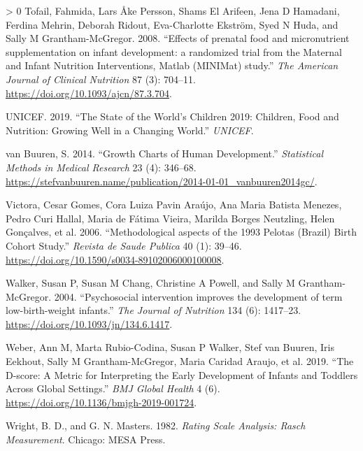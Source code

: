 \documentclass[
]{book}
\newlength{\cslhangindent}
\newenvironment{CSLReferences}[3] %
 {%
  \setlength{\parindent}{0pt}
  \ifodd #1 \everypar{\setlength{\hangindent}{\cslhangindent}}\ignorespaces\fi
  \ifnum #2 > 0
  \setlength{\parskip}{#2\baselineskip}
  \fi
 }%
 {}
\begin{document}
\begin{CSLReferences}{1}{0}
\leavevmode\hypertarget{ref-Tofail2008}{}%
Tofail, Fahmida, Lars Åke Persson, Shams El Arifeen, Jena D Hamadani, Ferdina Mehrin, Deborah Ridout, Eva-Charlotte Ekström, Syed N Huda, and Sally M Grantham-McGregor. 2008. {``{Effects of prenatal food and micronutrient supplementation on infant development: a randomized trial from the Maternal and Infant Nutrition Interventions, Matlab (MINIMat) study}.''} \emph{The American Journal of Clinical Nutrition} 87 (3): 704--11. \url{https://doi.org/10.1093/ajcn/87.3.704}.

\leavevmode\hypertarget{ref-unicef2019}{}%
UNICEF. 2019. {``The State of the World's Children 2019: Children, Food and Nutrition: Growing Well in a Changing World.''} \emph{UNICEF}.

\leavevmode\hypertarget{ref-vanbuuren2014}{}%
van Buuren, S. 2014. {``Growth Charts of Human Development.''} \emph{Statistical Methods in Medical Research} 23 (4): 346--68. \url{https://stefvanbuuren.name/publication/2014-01-01_vanbuuren2014gc/}.

\leavevmode\hypertarget{ref-Victora2006}{}%
Victora, Cesar Gomes, Cora Luiza Pavin Araújo, Ana Maria Batista Menezes, Pedro Curi Hallal, Maria de Fátima Vieira, Marilda Borges Neutzling, Helen Gonçalves, et al. 2006. {``{Methodological aspects of the 1993 Pelotas (Brazil) Birth Cohort Study.}''} \emph{Revista de Saude Publica} 40 (1): 39--46. \url{https://doi.org/10.1590/s0034-89102006000100008}.

\leavevmode\hypertarget{ref-Walker2004}{}%
Walker, Susan P, Susan M Chang, Christine A Powell, and Sally M Grantham-McGregor. 2004. {``{Psychosocial intervention improves the development of term low-birth-weight infants.}''} \emph{The Journal of Nutrition} 134 (6): 1417--23. \url{https://doi.org/10.1093/jn/134.6.1417}.

\leavevmode\hypertarget{ref-Weber2019}{}%
Weber, Ann M, Marta Rubio-Codina, Susan P Walker, Stef van Buuren, Iris Eekhout, Sally M Grantham-McGregor, Maria Caridad Araujo, et al. 2019. {``The {D-score}: A Metric for Interpreting the Early Development of Infants and Toddlers Across Global Settings.''} \emph{BMJ Global Health} 4 (6). \url{https://doi.org/10.1136/bmjgh-2019-001724}.

\leavevmode\hypertarget{ref-wright1982}{}%
Wright, B. D., and G. N. Masters. 1982. \emph{Rating Scale Analysis: Rasch Measurement}. Chicago: MESA Press.

\end{CSLReferences}
\end{document}
